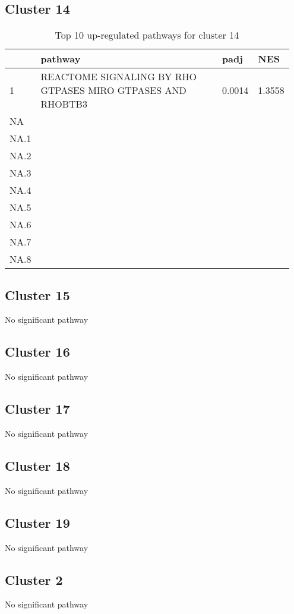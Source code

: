 \documentclass{article}
\begin{document}
\subsection{Cluster 14 }
\begin{table}[H]
\centering
\begin{tabular}{p{0.05\linewidth}p{0.7\linewidth}p{0.1\linewidth}p{0.1\linewidth}}
  \hline
 & pathway & padj & NES \\ 
  \hline
1 & REACTOME SIGNALING BY RHO GTPASES MIRO GTPASES AND RHOBTB3 & 0.0014 & 1.3558 \\ 
  NA &  &  &  \\ 
  NA.1 &  &  &  \\ 
  NA.2 &  &  &  \\ 
  NA.3 &  &  &  \\ 
  NA.4 &  &  &  \\ 
  NA.5 &  &  &  \\ 
  NA.6 &  &  &  \\ 
  NA.7 &  &  &  \\ 
  NA.8 &  &  &  \\ 
   \hline
\end{tabular}
\caption{Top 10 up-regulated pathways for cluster 14} 
\label{tab:q3_2_14}
\end{table}
\subsection{Cluster 15 }
No significant pathway
\subsection{Cluster 16 }
No significant pathway
\subsection{Cluster 17 }
No significant pathway
\subsection{Cluster 18 }
No significant pathway
\subsection{Cluster 19 }
No significant pathway
\subsection{Cluster 2 }
No significant pathway
\end{document}

